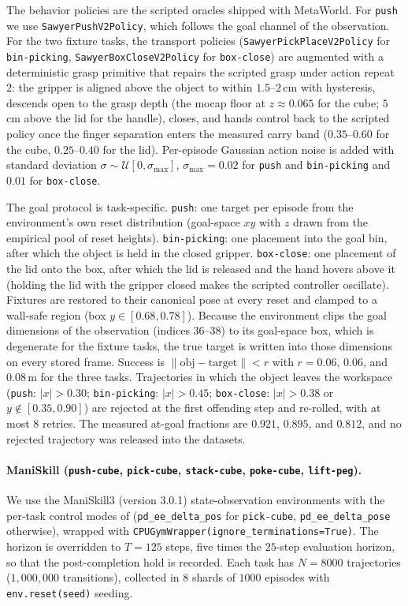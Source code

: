The behavior policies are the scripted oracles shipped with MetaWorld.
For \texttt{push} we use \texttt{SawyerPushV2Policy}, which follows the goal channel of the observation.
For the two fixture tasks, the transport policies (\texttt{SawyerPickPlaceV2Policy} for \texttt{bin-picking}, \texttt{SawyerBoxCloseV2Policy} for \texttt{box-close}) are augmented with a deterministic grasp primitive that repairs the scripted grasp under action repeat $2$: the gripper is aligned above the object to within $1.5$--$2$\,cm with hysteresis, descends open to the grasp depth (the mocap floor at $z \approx 0.065$ for the cube; $5$\,cm above the lid for the handle), closes, and hands control back to the scripted policy once the finger separation enters the measured carry band ($0.35$--$0.60$ for the cube, $0.25$--$0.40$ for the lid).
Per-episode Gaussian action noise is added with standard deviation $\sigma \sim \mathcal U[0, \sigma_{\max}]$, $\sigma_{\max} = 0.02$ for \texttt{push} and \texttt{bin-picking} and $0.01$ for \texttt{box-close}.

The goal protocol is task-specific.
\texttt{push}: one target per episode from the environment's own reset distribution (goal-space $xy$ with $z$ drawn from the empirical pool of reset heights).
\texttt{bin-picking}: one placement into the goal bin, after which the object is held in the closed gripper.
\texttt{box-close}: one placement of the lid onto the box, after which the lid is released and the hand hovers above it (holding the lid with the gripper closed makes the scripted controller oscillate).
Fixtures are restored to their canonical pose at every reset and clamped to a wall-safe region (box $y \in [0.68, 0.78]$).
Because the environment clips the goal dimensions of the observation (indices $36$--$38$) to its goal-space box, which is degenerate for the fixture tasks, the true target is written into those dimensions on every stored frame.
Success is $\|\mathrm{obj} - \mathrm{target}\| < r$ with $r = 0.06$, $0.06$, and $0.08$\,m for the three tasks.
Trajectories in which the object leaves the workspace (\texttt{push}: $|x| > 0.30$; \texttt{bin-picking}: $|x| > 0.45$; \texttt{box-close}: $|x| > 0.38$ or $y \notin [0.35, 0.90]$) are rejected at the first offending step and re-rolled, with at most $8$ retries.
The measured at-goal fractions are $0.921$, $0.895$, and $0.812$, and no rejected trajectory was released into the datasets.

\paragraph{ManiSkill (\texttt{push-cube}, \texttt{pick-cube}, \texttt{stack-cube}, \texttt{poke-cube}, \texttt{lift-peg}).}
We use the ManiSkill3 (version 3.0.1) state-observation environments with the per-task control modes of \citet{hansen-iclr26a} (\texttt{pd\_ee\_delta\_pos} for \texttt{pick-cube}, \texttt{pd\_ee\_delta\_pose} otherwise), wrapped with \texttt{CPUGymWrapper(ignore\_terminations=True)}.
The horizon is overridden to $T = 125$ steps, five times the $25$-step evaluation horizon, so that the post-completion hold is recorded.
Each task has $N = 8000$ trajectories ($1{,}000{,}000$ transitions), collected in $8$ shards of $1000$ episodes with \texttt{env.reset(seed)} seeding.

